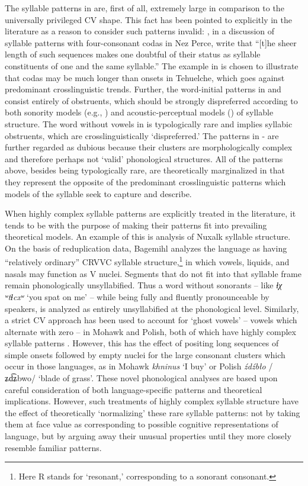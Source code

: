   The syllable patterns in  are, first of all, extremely large in comparison to the universally privileged CV shape. This fact has been pointed to explicitly in the literature as a reason to consider such patterns invalid: \citet[195]{KayeEtAl1990}, in a discussion of syllable patterns with four-consonant codas in Nez Perce, write that “[t]he sheer length of such sequences makes one doubtful of their status as syllable constituents of one and the same syllable.” The example in  is chosen to illustrate that codas may be much longer than onsets in Tehuelche, which goes against predominant crosslinguistic trends. Further, the word-initial patterns in  and  consist entirely of obstruents, which should be strongly dispreferred according to both sonority models (e.g., \citealt{Clements1990}) and acoustic-perceptual models (\citealt{OhalaKawasaki-Fukumori1997}) of syllable structure. The word without vowels in  is typologically rare and implies syllabic obstruents, which are crosslinguistically ‘dispreferred.’ The patterns in - are further regarded as dubious because their clusters are morphologically complex and therefore perhaps not ‘valid’ phonological structures. All of the patterns above, besides being typologically rare, are theoretically marginalized in that they represent the opposite of the predominant crosslinguistic patterns which models of the syllable seek to capture and describe.

  When highly complex syllable patterns are explicitly treated in the literature, it tends to be with the purpose of making their patterns fit into prevailing theoretical models. An example of this is  analysis of Nuxalk syllable structure. On the basis of reduplication data, Bagemihl analyzes the language as having “relatively ordinary” CRVVC syllable structure,\footnote{{Here R stands for ‘resonant,’ corresponding to a sonorant consonant.}} in which vowels, liquids, and nasals may function as V nuclei. Segments that do not fit into that syllable frame remain phonologically unsyllabified. Thus a word without sonorants -- like \textit{ɬχ ʷtɬcxʷ} ‘you spat on me’ -- while being fully and fluently pronounceable by speakers, is analyzed as entirely unsyllabified at the phonological level. Similarly, a strict CV approach has been used to account for ‘ghost vowels’ -- vowels which alternate with zero -- in Mohawk and Polish, both of which have highly complex syllable patterns \citep{Rowicka1999}. However, this has the effect of positing long sequences of simple onsets followed by empty nuclei for the large consonant clusters which occur in those languages, as in Mohawk \textit{khninus} ‘I buy’ or Polish \textit{źdźbło} /ʑd͡ʑbwo/ ‘blade of grass’. These novel phonological analyses are based upon careful consideration of both language-specific patterns and theoretical implications. However, such treatments of highly complex syllable structure have the effect of theoretically ‘normalizing’ these rare syllable patterns: not by taking them at face value as corresponding to possible cognitive representations of language, but by arguing away their unusual properties until they more closely resemble familiar patterns.

